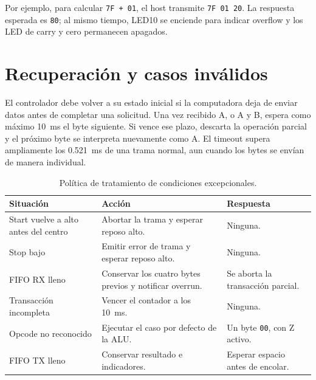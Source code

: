 Por ejemplo, para calcular \texttt{7F + 01}, el host transmite
\texttt{7F 01 20}. La respuesta esperada es \texttt{80}; al mismo
tiempo, LED10 se enciende para indicar overflow y los LED de carry y
cero permanecen apagados.

\section{Recuperación y casos inválidos}

El controlador debe volver a su estado inicial si la computadora deja
de enviar datos antes de completar una solicitud. Una vez recibido A,
o A y B, espera como máximo \SI{10}{\milli\second} el byte siguiente.
Si vence ese plazo, descarta la operación parcial y el próximo byte
se interpreta nuevamente como A. El timeout supera ampliamente los
\SI{0.521}{\milli\second} de una trama normal, aun cuando los bytes
se envían de manera individual.

\begin{table}[H]
  \centering
  \begin{tabularx}{\textwidth}{L{4.0cm}L{4.6cm}Y}
    \toprule
    \textbf{Situación} & \textbf{Acción} & \textbf{Respuesta} \\
    \midrule
    Start vuelve a alto antes del centro & Abortar la trama y esperar
    reposo alto. & Ninguna. \\
    Stop bajo & Emitir error de trama y esperar reposo alto. & Ninguna. \\
    FIFO RX lleno & Conservar los cuatro bytes previos y notificar
    overrun. & Se aborta la transacción parcial. \\
    Transacción incompleta & Vencer el contador a los
    \SI{10}{\milli\second}. & Ninguna. \\
    Opcode no reconocido & Ejecutar el caso por defecto de la ALU. &
    Un byte \texttt{00}, con Z activo. \\
    FIFO TX lleno & Conservar resultado e indicadores. & Esperar espacio
    antes de encolar. \\
    \bottomrule
  \end{tabularx}
  \caption{Política de tratamiento de condiciones excepcionales.}%
\end{table}
